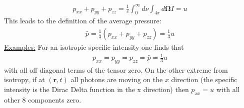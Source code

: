 \documentclass[15pt]{article}
\begin{document}
\begin{itemize}
\begin{align}
    p_{xx}+p_{yy}+p_{zz} = \frac{1}{c}\int_0^\infty d\nu \int_{4\pi} d\bm\Omega I=u
\end{align}
This leads to the definition of the average pressure:
\begin{align}
    \bar{p}=\frac{1}{3}(p_{xx}+p_{yy}+p_{zz})=\frac{1}{3}u
\end{align}
\underline{Examples:} For an isotropic specific intensity one finds that
\begin{align}
    p_{xx}=p_{yy}=p_{zz}=\bar{p}=\frac{1}{3}u
\end{align}
with all off diagonal terms of the tensor zero.
On the other extreme from isotropy, if at $(\bm r,t)$ all photons are moving on the $x$ direction (the specific intensity is the Dirac Delta function in the x direction) then $p_{xx}=u$ with all other 8 components zero.
\end{itemize}
\end{document}
